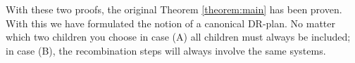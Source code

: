 

With these two proofs, the original Theorem \ref{theorem:main} has been proven. With this we have formulated the notion of a canonical DR-plan.
No matter which two children you choose in case (A) all children must always be included; in case (B), the recombination steps will always involve the same systems.












